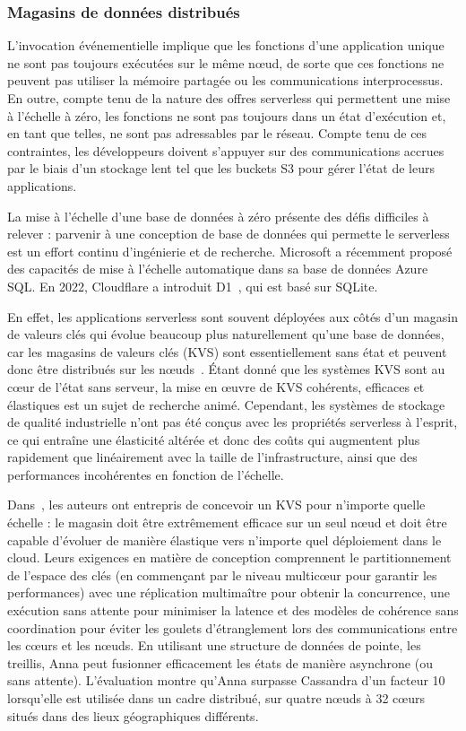 \subsubsection{Magasins de données distribués}

L'invocation événementielle implique que les fonctions d'une application unique ne sont pas toujours exécutées sur le même nœud, de sorte que ces fonctions ne peuvent pas utiliser la mémoire partagée ou les communications interprocessus. En outre, compte tenu de la nature des offres serverless qui permettent une mise à l'échelle à zéro, les fonctions ne sont pas toujours dans un état d'exécution et, en tant que telles, ne sont pas adressables par le réseau. Compte tenu de ces contraintes, les développeurs doivent s'appuyer sur des communications accrues par le biais d'un stockage lent tel que les buckets S3 pour gérer l'état de leurs applications.

La mise à l'échelle d'une base de données à zéro présente des défis difficiles à relever : parvenir à une conception de base de données qui permette le serverless est un effort continu d'ingénierie et de recherche. Microsoft a récemment proposé des capacités de mise à l'échelle automatique dans sa base de données Azure SQL. En 2022, Cloudflare a introduit D1~\cite{cloudflare-d1}, qui est basé sur SQLite.

En effet, les applications serverless sont souvent déployées aux côtés d'un magasin de valeurs clés qui évolue beaucoup plus naturellement qu'une base de données, car les magasins de valeurs clés (KVS) sont essentiellement sans état et peuvent donc être distribués sur les nœuds~\cite{Klimovic2018PocketEE}. Étant donné que les systèmes KVS sont au cœur de l'état sans serveur, la mise en œuvre de KVS cohérents, efficaces et élastiques est un sujet de recherche animé. Cependant, les systèmes de stockage de qualité industrielle n'ont pas été conçus avec les propriétés serverless à l'esprit, ce qui entraîne une élasticité altérée et donc des coûts qui augmentent plus rapidement que linéairement avec la taille de l'infrastructure, ainsi que des performances incohérentes en fonction de l'échelle.

Dans~\cite{Wu2018AnnaAK}, les auteurs ont entrepris de concevoir un KVS pour n'importe quelle échelle : le magasin doit être extrêmement efficace sur un seul nœud et doit être capable d'évoluer de manière élastique vers n'importe quel déploiement dans le cloud. Leurs exigences en matière de conception comprennent le partitionnement de l'espace des clés (en commençant par le niveau multicœur pour garantir les performances) avec une réplication multimaître pour obtenir la concurrence, une exécution sans attente pour minimiser la latence et des modèles de cohérence sans coordination pour éviter les goulets d'étranglement lors des communications entre les cœurs et les nœuds. En utilisant une structure de données de pointe, les treillis, Anna peut fusionner efficacement les états de manière asynchrone (ou sans attente). L'évaluation montre qu'Anna surpasse Cassandra d'un facteur 10 lorsqu'elle est utilisée dans un cadre distribué, sur quatre nœuds à 32 cœurs situés dans des lieux géographiques différents.


